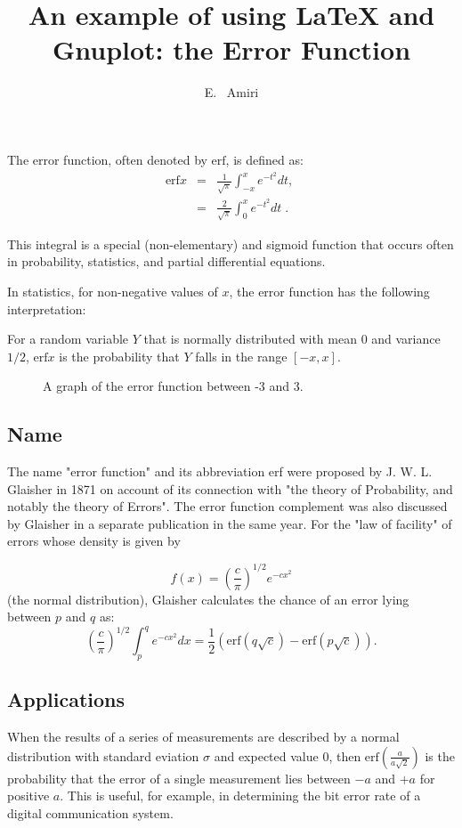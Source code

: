 \documentclass[twocolumn]{article}
\title{An example of using \LaTeX{} and Gnuplot: the Error Function}
\author{E. ~Amiri}
\begin{document}
\maketitle
\noindent
The error function, often denoted by $\textrm{erf}$, is defined as: 
\begin{eqnarray}\label{err-eq}
\textrm{erf} x &=& \frac{1}{\sqrt{\pi}} \int_{-x}^{x}e^{-t^{2}} dt,\;
\\
&=& \frac{2}{\sqrt{\pi}} \int_{0}^{x}e^{-t^{2}} dt\;.
\end{eqnarray}

This integral is a special (non-elementary) and sigmoid function that occurs often in probability, statistics, and partial differential equations.

In statistics, for non-negative values of $x$, the error function has the following interpretation: 

For a random variable $Y$ that is normally distributed with mean $0$ and variance $1/2$, $\textrm{erf} x$ is the probability that $Y$ falls in the range $\left[-x,x\right]$.

\begin{figure}[h!]

\caption{A graph of the error function between -3 and 3.}
\end{figure}

\subsection*{Name}
The name "error function" and its abbreviation erf were proposed by J. W. L. Glaisher in 1871 on account of its connection with "the theory of Probability, and notably the theory of Errors". The error function complement was also discussed by Glaisher in a separate publication in the same year. For the "law of facility" of errors whose density is given by

\begin{equation}\label{density}
f(x)= \left(\frac{c}{\pi}\right)^{1/2} e^{-cx^{2}}
\end{equation}
(the normal distribution), Glaisher calculates the chance of an error lying between $p$ and $q$ as: 
\begin{equation}\label{err-ex}
\left(\frac{c}{\pi}\right)^{1/2} \int_{p}^{q} e^{-cx^{2}} dx = \frac{1}{2} \left(\textrm{erf}(q\sqrt{c}) - \textrm{erf}(p\sqrt{c}) \right).
\end{equation}

\subsection*{Applications}
When the results of a series of measurements are described by a normal distribution with standard eviation $\sigma$ and expected value $0$, then $\textrm{erf}\left(\frac{a}{a\sqrt{2}} \right)$ is the probability that the error of a single measurement lies between $-a$ and $+a$ for positive $a$. This is useful, for example, in determining the bit error rate of a digital communication system.
\end{document}
